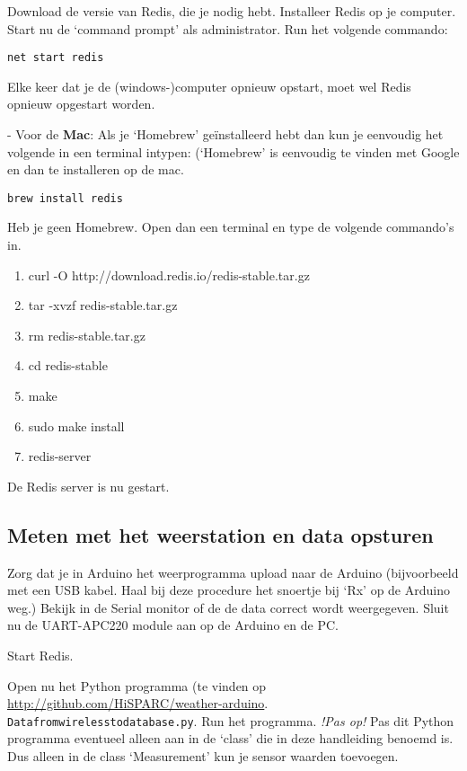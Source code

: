 Download de versie van Redis, die je nodig hebt.
Installeer Redis op je computer. Start nu de `command prompt' als administrator.
Run het volgende commando:

\begin{verbatim}
net start redis
\end{verbatim}

Elke keer dat je de (windows-)computer opnieuw opstart, moet wel Redis opnieuw opgestart worden.

- Voor de \textbf{Mac}:
Als je `Homebrew' geïnstalleerd hebt dan kun je eenvoudig het volgende
in een terminal intypen: (`Homebrew' is eenvoudig te vinden met Google
en dan te installeren op de mac.

\begin{verbatim}
brew install redis
\end{verbatim}

Heb je geen Homebrew. Open dan een terminal en type de volgende commando's in.

\begin{enumerate}
    \item curl -O http://download.redis.io/redis-stable.tar.gz
    \item tar -xvzf redis-stable.tar.gz
    \item rm redis-stable.tar.gz
    \item cd redis-stable
    \item make
    \item sudo make install
    \item redis-server
 \end{enumerate}

De Redis server is nu gestart.


\subsection{Meten met het weerstation en data opsturen}

Zorg dat je in Arduino het weerprogramma upload naar de Arduino
(bijvoorbeeld met een USB kabel. Haal bij deze procedure het snoertje bij `Rx' op de
Arduino weg.) Bekijk in de Serial monitor of de de data correct wordt
weergegeven. Sluit nu de UART-APC220 module aan op de Arduino en de PC.

Start Redis.

Open nu het Python programma (te vinden op
\url{http://github.com/HiSPARC/weather-arduino}. \verb|Datafromwirelesstodatabase.py|.
Run het programma.
\emph{!Pas op!} Pas dit Python programma eventueel alleen aan in de `class' die in deze
handleiding benoemd is. Dus alleen in de class `Measurement' kun je sensor waarden
toevoegen.

